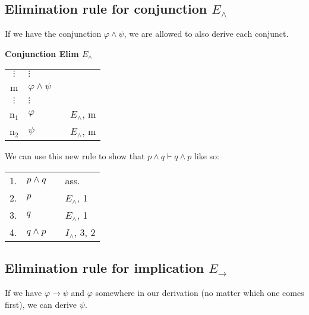 \documentclass[nobib,nofonts]{tufte-handout}
\begin{document}
\subsection{Elimination rule for conjunction $E_{\wedge}$}

If we have the conjunction $\varphi \wedge \psi$, we are allowed to also derive each conjunct.

\bigskip
\noindent \colorbox{mygray!60}{\centering
  \begin{minipage}[t]{0.35\linewidth}
    \textbf{Conjunction Elim $E_{\wedge}$}
  \end{minipage}
  \begin{minipage}[t]{0.55\linewidth}
    \begin{tabular}{clcl}
      $\vdots$ & $\vdots$              & \\
      m        & $\varphi \wedge \psi$ &  \\
      $\vdots$ & $\vdots$              & \\
      n$_{1}$  & $\varphi$             & & $E_{\wedge}$, m \\
      n$_{2}$  & $\psi$                & & $E_{\wedge}$, m
    \end{tabular}
  \end{minipage}
}
\bigskip

We can use this new rule to show that $p \wedge q \vdash q \wedge p$ like so:

\begin{tabular}{clcl}
  1. & $p \wedge q$ & & ass. \\
  2. & $p$          & & $E_{\wedge}$, 1 \\
  3. & $q$          & & $E_{\wedge}$, 1 \\
  4. & $q \wedge p$ & & $I_{\wedge}$, 3, 2
\end{tabular}


\subsection{Elimination rule for implication $E_{\rightarrow}$}

If we have $\varphi \rightarrow \psi$ and $\varphi$ somewhere in our derivation (no matter which one comes first), we can derive $\psi$.
\end{document}
